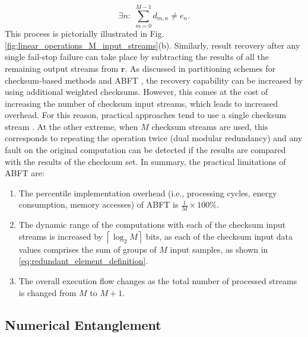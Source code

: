 \documentclass[twocolumn,english,onecolumn]{IEEEtran}
\theoremstyle{plain}
\theoremstyle{plain}
\begin{document}
\begin{equation}
\exists n:\;\sum_{m=0}^{M-1}d_{m,n}\neq e_{n}.\label{eq:error_checking}
\end{equation}
This process is pictorially illustrated in Fig. \ref{fig:linear_operations_M_input_streams}(b).
Similarly, result recovery after any single fail-stop failure can
take place by subtracting the results of all the remaining output
streams from $\mathbf{r}$. As discussed in partitioning schemes for
checksum-based methods and ABFT \cite{rexford1992partitioned,sloan2012algorithmic},
the recovery capability can be increased by using additional weighted
checksums. However, this comes at the cost of increasing the number
of checksum input streams, which leads to increased overhead. For
this reason, practical approaches tend to use a single checksum stream
\cite{bosilca2009algorithm,chen2005fault,murray2008spread,huang1984algorithm,sloan2012algorithmic}.
At the other extreme, when $M$ checksum streams are used, this corresponds
to repeating the operation twice (dual modular redundancy) and any
fault on the original computation can be detected if the results are
compared with the results of the checksum set. In summary, the practical
limitations of ABFT are: 
\begin{enumerate}
\item The percentile implementation overhead (i.e., processing cycles, energy
consumption, memory accesses) of ABFT is $\frac{1}{M}\times100\%$. 
\item The dynamic range of the computations with each of the checksum input
streams is increased by $\left\lceil \log_{2}M\right\rceil $ bits,
as each of the checksum input data values comprises the sum of groups
of $M$ input samples, as shown in \eqref{eq:redundant_element_definition}. 
\item The overall execution flow changes as the total number of processed
streams is changed from $M$ to $M+1$. 
\end{enumerate}

\subsection{Numerical Entanglement}
\end{document}
